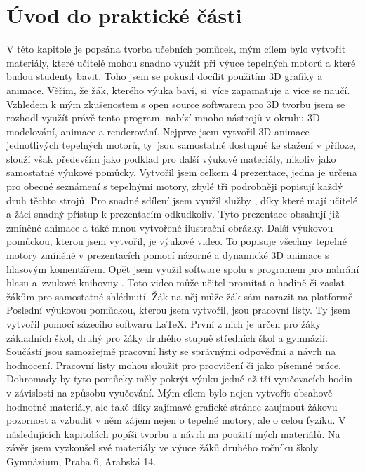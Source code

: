 \section{Úvod do praktické části}
{V této kapitole je popsána tvorba učebních pomůcek, mým cílem bylo vytvořit materiály, které učitelé mohou snadno využít při výuce tepelných motorů a které budou studenty bavit. Toho jsem se pokusil docílit použitím 3D grafiky a animace. Věřím, že žák, kterého výuka baví, si~více zapamatuje a více se naučí.}\odst
{Vzhledem k mým zkušenostem s open source softwarem  pro 3D tvorbu jsem se rozhodl využít právě tento program.  nabízí mnoho nástrojů v okruhu 3D modelování, animace a renderování. Nejprve jsem vytvořil 3D animace jednotlivých tepelných motorů, ty~jsou samostatně dostupné ke stažení v příloze, slouží však především jako podklad pro další výukové materiály, nikoliv jako samostatné výukové pomůcky.}\odst
{Vytvořil jsem celkem 4 prezentace, jedna je určena pro obecné seznámení s tepelnými motory, zbylé tři podrobněji popisují každý druh těchto strojů. Pro snadné sdílení jsem využil služby , díky které mají učitelé a žáci snadný přístup k prezentacím odkudkoliv. Tyto prezentace obsahují již zmíněné animace a také mnou vytvořené ilustrační obrázky.}\odst
{Další výukovou pomůckou, kterou jsem vytvořil, je výukové video. To popisuje všechny tepelné motory zmíněné v prezentacích pomocí názorné a dynamické 3D animace s hlasovým komentářem. Opět jsem využil software  spolu s programem  pro nahrání hlasu a~zvukové knihovny . Toto video může učitel promítat o hodině či zaslat žákům pro samostatné shlédnutí. Žák na něj může žák sám narazit na platformě .}\odst
{Poslední výukovou pomůckou, kterou jsem vytvořil, jsou pracovní listy. Ty jsem vytvořil pomocí sázecího softwaru \LaTeX. První z nich je určen pro žáky základních škol, druhý pro žáky druhého stupně středních škol a gymnázií. Součástí jsou samozřejmě pracovní listy se správnými odpověďmi a návrh na hodnocení. Pracovní listy mohou sloužit pro procvičení či jako písemné práce.}\odst
{Dohromady by tyto pomůcky měly pokrýt výuku jedné až tří vyučovacích hodin v závislosti na způsobu vyučování. Mým cílem bylo nejen vytvořit obsahově hodnotné materiály, ale také díky zajímavé grafické stránce zaujmout žákovu pozornost a vzbudit v něm zájem nejen o tepelné motory, ale o celou fyziku. V následujících kapitolách popíši tvorbu a návrh na použití mých materiálů. Na závěr jsem vyzkoušel své materiály ve výuce žáků druhého ročníku školy Gymnázium, Praha 6, Arabská 14.}